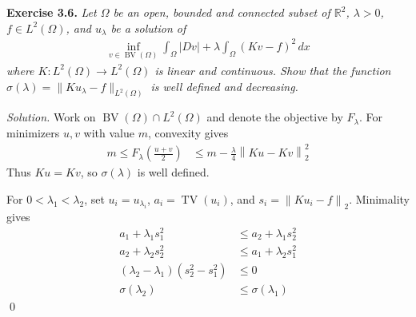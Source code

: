 \documentclass[12pt,letterpaper]{article}
\newcommand{\R}{\mathbb R}
\newcommand{\TV}{\operatorname{TV}}
\newcommand{\BV}{\operatorname{BV}}
\newcommand{\dx}{\,dx}
\newcommand{\norm}[1]{\left\lVert #1\right\rVert}
\newcommand{\exercise}[1]{%
  \par\bigskip\noindent\textbf{Exercise #1.}\enspace}
\newenvironment{statement}{\itshape\ignorespaces}{\par}
\newcommand{\solution}{\par\medskip\noindent\textit{Solution.}\enspace}
\newcommand{\finish}{\qed\par}
\begin{document}
\begin{samepage}
\exercise{3.6}
\begin{statement}
Let $\Omega$ be an open, bounded and connected subset of $\R^2$,
$\lambda>0$, $f\in L^2(\Omega)$, and $u_\lambda$ be a solution of
\begin{align*}
 \inf_{v\in\BV(\Omega)}\int_\Omega|Dv|
       +\lambda\int_\Omega(Kv-f)^2\dx
\end{align*}
where $K:L^2(\Omega)\to L^2(\Omega)$ is linear and continuous.
Show that the function $\sigma(\lambda)=\|Ku_\lambda-f\|_{L^2(\Omega)}$
is well defined and decreasing.
\end{statement}
\end{samepage}

\solution
Work on $\BV(\Omega)\cap L^2(\Omega)$ and denote the objective by
$F_\lambda$. For minimizers $u,v$ with value $m$, convexity gives
\begin{align*}
 m\le F_\lambda\!\left(\frac{u+v}{2}\right)
 &\le m-\frac\lambda4\norm{Ku-Kv}_2^2
\end{align*}
Thus $Ku=Kv$, so $\sigma(\lambda)$ is well defined.

For $0<\lambda_1<\lambda_2$, set $u_i=u_{\lambda_i}$,
$a_i=\TV(u_i)$, and $s_i=\norm{Ku_i-f}_2$. Minimality gives
\begin{align*}
 a_1+\lambda_1s_1^2&\le a_2+\lambda_1s_2^2\\
 a_2+\lambda_2s_2^2&\le a_1+\lambda_2s_1^2\\
 (\lambda_2-\lambda_1)(s_2^2-s_1^2)&\le0\\
 \sigma(\lambda_2)&\le\sigma(\lambda_1)
\end{align*}
\finish
\end{document}
